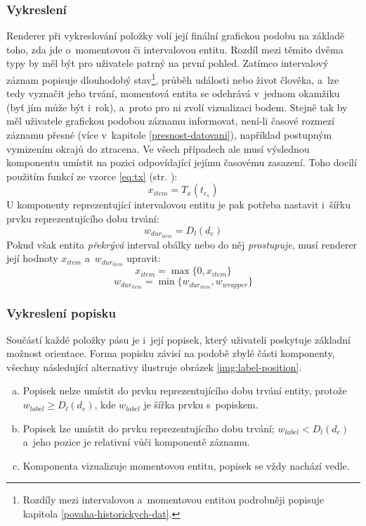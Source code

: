 			\subsubsection*{Vykreslení}
				Renderer při vykreslování položky volí její finální grafickou podobu na základě toho, zda jde o~momentovou či intervalovou entitu. Rozdíl mezi těmito dvěma typy by měl být pro uživatele patrný na první pohled. Zatímco intervalový záznam popisuje dlouhodobý stav\footnote{Rozdíly mezi intervalovou a~momentovou entitou podrobněji popisuje kapitola \ref{povaha-historickych-dat}.}, průběh události nebo život člověka, a~lze tedy vyznačit jeho trvání, momentová entita se odehrává v~jednom okamžiku (byť jím může být i~rok), a~proto pro ni zvolí vizualizaci bodem. Stejně tak by měl uživatele grafickou podobou záznamu informovat, není-li časové rozmezí záznamu přesné (více v~kapitole \ref{presnost-datovani}), například postupným vymizením okrajů do ztracena.
				Ve všech případech ale musí výslednou komponentu umístit na pozici odpovídající jejímu časovému zasazení. Toho docílí použitím funkcí ze vzorce \ref{eq:tx} (str. \pageref{eq:tx}):
				$$x_{item} = T_x(t_{e_s})$$
				U komponenty reprezentující intervalovou entitu je pak potřeba nastavit i~šířku prvku reprezentujícího dobu trvání:
				$$w_{dur_{item}} = D_l(d_e)$$
				Pokud však entita \emph{překrývá} interval obálky nebo do něj \emph{prostupuje}, musí renderer její hodnoty $x_{item}$ a~$w_{dur_{item}}$ upravit:
				$$x_{item} = \max\{0, x_{item}\}$$
				$$w_{dur_{item}} = \min\{w_{dur_{item}}, w_{wrapper}\}$$
				
			\subsubsection*{Vykreslení popisku}
				Součástí každé položky pásu je i~její popisek, který uživateli poskytuje základní možnost orientace. Forma popisku závisí na podobě zbylé části komponenty, všechny následující alternativy ilustruje obrázek \ref{img:label-position}.
				\begin{enumerate}[a)]
					\item Popisek nelze umístit do prvku reprezentujícího dobu trvání entity, protože $w_{label} \ge D_l(d_e)$, kde $w_{label}$ je šířka prvku s~popiskem.
					\item Popisek lze umístit do prvku reprezentujícího dobu trvání; \mbox{$w_{label} < D_l(d_e)$} a~jeho pozice je relativní vůči komponentě záznamu.
					\item Komponenta vizualizuje momentovou entitu, popisek se vždy nachází vedle.
				\end{enumerate}
				
